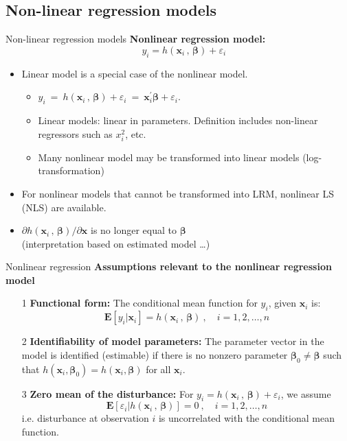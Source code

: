 \documentclass{beamer}
\begin{document}
\subsection{Non-linear regression models}
\begin{frame}{Non-linear regression models}
\textbf{Nonlinear regression model:}
$$
~~~~~y_i = h(\bm{x}_i\, , \,\bm{\beta}) + \varepsilon_i
$$
\begin{itemize}
    \item Linear model is a special case of the nonlinear model.
    \begin{itemize}
        \smallskip
        \item $y_i ~=~ h(\bm{x}_i\, , \,\bm{\beta}) + \varepsilon_i ~=~ \bm{x}_i^{\prime}\bm{\beta} + \varepsilon_i$.
        \smallskip
        \item Linear models: linear in parameters. Definition includes non-linear regressors such as $x_i^2$, etc.
        \smallskip
        \item Many nonlinear model may be transformed into linear models (log-transformation)
    \end{itemize}
    \medskip
    \item For nonlinear models that cannot be transformed into LRM, nonlinear LS (NLS) are available.
    \medskip
    \item $\partial h(\bm{x}_i\, , \,\bm{\beta})/\partial \bm{x}$ is no longer equal to $\bm\beta$ \\
    (interpretation based on estimated model \dots)
\end{itemize}
\end{frame}
\begin{frame}{Nonlinear regression}
\textbf{Assumptions relevant to the nonlinear regression model}\\
\begin{itemize}
 \item[1] \textbf{Functional form:} The conditional mean function for $y_i$, given $\bm{x}_i$ is: $$\mathbf{E}[y_i|\bm{x}_i] = h(\bm{x}_i\, , \,\bm{\beta})~, \quad i=1,2,\dots,n$$
 \item[2] \textbf{Identifiability of model parameters:} The parameter vector in the model is identified (estimable) if there is no nonzero parameter $\bm{\beta}_0 \neq \bm{\beta}$ such that $h(\bm{x}_i, \bm{\beta}_0)=h(\bm{x}_i, \bm{\beta})$ for all $\bm{x}_i$.
 \medskip
 \item[3] \textbf{Zero mean of the disturbance:} For $y_i = h(\bm{x}_i\, , \,\bm{\beta}) + \varepsilon_i$, we assume $$
 \mathbf{E}[\varepsilon_i| h(\bm{x}_i\, , \,\bm{\beta})] = 0~, \quad i=1,2,\dots,n
 $$
 i.e. disturbance at observation $i$ is uncorrelated with the conditional mean function.
\end{itemize}
\end{frame}
\end{document}
